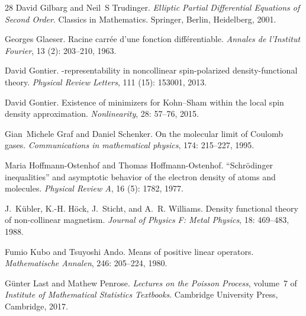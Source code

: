 \documentclass[final,reqno]{amsart}
\theoremstyle{remark}
\begin{document}
\begin{thebibliography}{28}
David Gilbarg and Neil~S Trudinger.
\newblock \emph{Elliptic Partial Differential Equations of Second Order}.
\newblock Classics in Mathematics. Springer, Berlin, Heidelberg, 2001.

Georges Glaeser.
\newblock Racine carr{\'e}e d'une fonction diff{\'e}rentiable.
\newblock \emph{Annales de l'Institut Fourier}, 13 (2):
  203--210, 1963.

David Gontier.
-representability in noncollinear spin-polarized
  density-functional theory.
\newblock \emph{Physical Review Letters}, 111 (15): 153001,
  2013.

David Gontier.
\newblock Existence of minimizers for {K}ohn--{S}ham within the local spin
  density approximation.
\newblock \emph{Nonlinearity}, 28: 57--76, 2015.

Gian~Michele Graf and Daniel Schenker.
\newblock On the molecular limit of {C}oulomb gases.
\newblock \emph{Communications in mathematical physics}, 174:
  215--227, 1995.

Maria Hoffmann-Ostenhof and Thomas Hoffmann-Ostenhof.
\newblock ``{S}chr{\"o}dinger inequalities'' and asymptotic behavior of the
  electron density of atoms and molecules.
\newblock \emph{Physical Review A}, 16 (5): 1782, 1977.

J.~K{\"u}bler, K.-H. H{\"o}ck, J.~Sticht, and A.~R. Williams.
\newblock Density functional theory of non-collinear magnetism.
\newblock \emph{Journal of Physics F: Metal Physics}, 18: 469--483,
  1988.

Fumio Kubo and Tsuyoshi Ando.
\newblock Means of positive linear operators.
\newblock \emph{Mathematische Annalen}, 246: 205--224, 1980.

G{\"u}nter Last and Mathew Penrose.
\newblock \emph{Lectures on the {P}oisson Process}, volume~7 of \emph{Institute
  of Mathematical Statistics Textbooks}.
\newblock Cambridge University Press, Cambridge, 2017.


\end{thebibliography}
\end{document}
